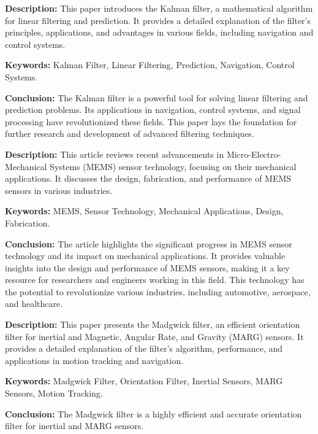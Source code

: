 {
	\textbf{Description:} This paper introduces the Kalman filter, a mathematical algorithm for linear filtering and prediction. It provides a detailed explanation of the filter’s principles, applications, and advantages in various fields, including navigation and control systems.
	\newline
	
	\textbf{Keywords:} Kalman Filter, Linear Filtering, Prediction, Navigation, Control Systems.
	
	\newpage
	\textbf{Conclusion:} The Kalman filter is a powerful tool for solving linear filtering and prediction problems. Its applications in navigation, control systems, and signal processing have revolutionized these fields. This paper lays the foundation for further research and development of advanced filtering techniques\cite{Kalman:2012}.
}

{
	\textbf{Description:} This article reviews recent advancements in Micro-Electro-Mechanical Systems (MEMS) sensor technology, focusing on their mechanical applications. It discusses the design, fabrication, and performance of MEMS sensors in various industries.
	\newline
	
	\textbf{Keywords:} MEMS, Sensor Technology, Mechanical Applications, Design, Fabrication.
	
	\newpage
	\textbf{Conclusion:} The article highlights the significant progress in MEMS sensor technology and its impact on mechanical applications. It provides valuable insights into the design and performance of MEMS sensors, making it a key resource for researchers and engineers working in this field. This technology has the potential to revolutionize various industries, including automotive, aerospace, and healthcare\cite{Khoshnoud:2012}.
}

{
	\textbf{Description:} This paper presents the Madgwick filter, an efficient orientation filter for inertial and Magnetic, Angular Rate, and Gravity (MARG) sensors. It provides a detailed explanation of the filter’s algorithm, performance, and applications in motion tracking and navigation.
	\newline
	
	\textbf{Keywords:} Madgwick Filter, Orientation Filter, Inertial Sensors, MARG Sensors, Motion Tracking.
	
	\newpage
	\textbf{Conclusion:} The Madgwick filter is a highly efficient and accurate orientation filter for inertial and MARG sensors.
	
}